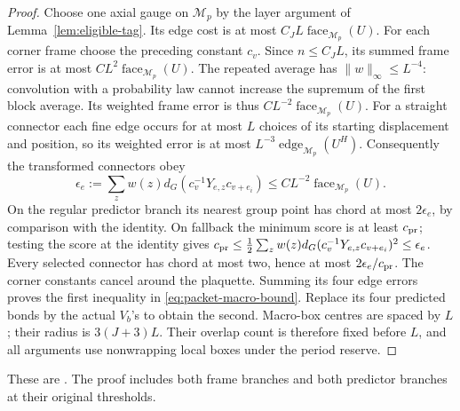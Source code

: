 \documentclass[11pt,reqno]{amsart}
\numberwithin{equation}{section}
\theoremstyle{definition}
\theoremstyle{remark}
\begin{document}
\begin{proof}
Choose one axial gauge on \(\mathcal M_p\) by the layer
argument of Lemma~\ref{lem:eligible-tag}. Its edge cost is at
most \(C_JL\operatorname{face}_{\mathcal M_p}(U)\).
For each corner frame choose the preceding constant \(c_v\).
Since \(n\le C_JL\), its summed frame error is at most
\(CL^2\operatorname{face}_{\mathcal M_p}(U)\).
The repeated average has \(\|w\|_\infty\le L^{-4}\):
convolution with a probability law cannot increase the supremum
of the first block average. Its weighted frame error is thus
\(CL^{-2}\operatorname{face}_{\mathcal M_p}(U)\).
For a straight connector each fine edge occurs for at most
\(L\) choices of its starting displacement and position, so
its weighted error is at most
\(L^{-3}\operatorname{edge}_{\mathcal M_p}(U^H)\).
Consequently the transformed connectors obey
\[
 \epsilon_e:=\sum_z w(z)d_G(c_v^{-1}Y_{e,z}c_{v+e_i})
                              \le CL^{-2}\operatorname{face}_{\mathcal M_p}(U).
\]
On the regular predictor branch its nearest group point has
chord at most \(2\epsilon_e\), by comparison with the identity.
On fallback the minimum score is at least \(c_{\rm pr}\);
testing the score at the identity gives
\(c_{\rm pr}\le\frac12\sum_z w(z)d_G(c_v^{-1}Y_{e,z}c_{v+e_i})^2
\le\epsilon_e\). Every selected connector has chord at most
two, hence at most \(2\epsilon_e/c_{\rm pr}\).
The corner constants cancel around the plaquette. Summing its
four edge errors proves the first inequality in
\eqref{eq:packet-macro-bound}. Replace its four predicted bonds
by the actual \(V_b\)'s to obtain the second.
Macro-box centres are spaced by \(L\); their radius is
\(3(J+3)L\). Their overlap count is therefore fixed before
\(L\), and all arguments use nonwrapping local boxes under
the period reserve.
\end{proof}

These are \cite[Lemma~14.5, Proposition~14.6 and
Corollary~14.7, pp.~61--62]{Main}. The proof includes both frame
branches and both predictor branches at their original thresholds.
\end{document}
